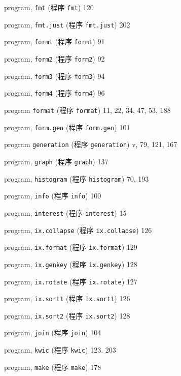 \begin{multicols}{2}
\hangindent=2pc  program, \verb'fmt' (程序 \verb'fmt') 120

\hangindent=2pc  program, \verb'fmt.just' (程序 \verb'fmt.just')
202

\hangindent=2pc  program, \verb'form1' (程序 \verb'form1') 91

\hangindent=2pc  program, \verb'form2' (程序 \verb'form2') 92

\hangindent=2pc  program, \verb'form3' (程序 \verb'form3') 94

\hangindent=2pc  program, \verb'form4' (程序 \verb'form4') 96

\hangindent=2pc  program \verb'format' (程序 \verb'format')
11, 22, 34, 47, 53, 188

\hangindent=2pc  program, \verb'form.gen' (程序 \verb'form.gen') 101

\hangindent=2pc  program \verb'generation' (程序 \verb'generation')
v, 79, 121, 167

\hangindent=2pc  program, \verb'graph' (程序 \verb'graph') 137

\hangindent=2pc  program, \verb'histogram' (程序 \verb'histogram')
70, 193

\hangindent=2pc  program, \verb'info' (程序 \verb'info') 100

\hangindent=2pc  program, \verb'interest' (程序 \verb'interest') 15

\hangindent=2pc  program, \verb'ix.collapse' (程序
\verb'ix.collapse') 126

\hangindent=2pc  program, \verb'ix.format' (程序 \verb'ix.format')
129

\hangindent=2pc  program, \verb'ix.genkey' (程序 \verb'ix.genkey')
128

\hangindent=2pc  program, \verb'ix.rotate' (程序 \verb'ix.rotate')
127

\hangindent=2pc  program, \verb'ix.sort1' (程序 \verb'ix.sort1') 126

\hangindent=2pc  program, \verb'ix.sort2' (程序 \verb'ix.sort2') 128

\hangindent=2pc  program, \verb'join' (程序 \verb'join') 104

\hangindent=2pc  program, \verb'kwic' (程序 \verb'kwic') 123. 203

\hangindent=2pc  program, \verb'make' (程序 \verb'make') 178


\end{multicols}
